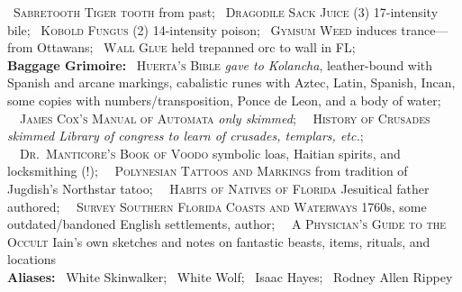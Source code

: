 \documentclass[11pt]{article}
\newcommand{\heading}[1]{{\sc\bfseries #1}}
\begin{document}
\ \textsc{Sabretooth Tiger tooth} from past;
\ \textsc{Dragodile Sack Juice} (3) 17-intensity bile;
\ \textsc{Kobold Fungus} (2) 14-intensity poison;
\ \textsc{Gymsum Weed} induces trance---from Ottawans;
\ \textsc{Wall Glue} held trepanned orc to wall in FL;
%
\\[6pt]
%
\heading{Baggage Grimoire:}
\
\textsc{Huerta's Bible} {\it gave to Kolancha}, leather-bound with
Spanish and arcane markings, cabalistic runes with Aztec, Latin,
Spanish, Incan, some copies with numbers/transposition, Ponce de Leon,
and a body of water;
\ \
\textsc{James Cox's Manual of Automata} {\it only skimmed};
\ \
\textsc{History of Crusades} {\it skimmed Library of congress to learn
  of crusades, templars, etc.};
\ \
\textsc{Dr.\ Manticore's Book of Voodo} symbolic loas, Haitian
spirits, and locksmithing (!);
\ \
\textsc{Polynesian Tattoos and Markings} from tradition of Jugdish's
Northstar tatoo;
\ \
\textsc{Habits of Natives of Florida} Jesuitical father authored;
\ \
\textsc{Survey Southern Florida Coasts and Waterways} 1760s, some
outdated/bandoned English settlements, author;
\ \
\textsc{A Physician's Guide to the Occult} Iain's own sketches and
notes on fantastic beasts, items, rituals, and locations
\\[6pt]
\heading{Aliases:} \ White Skinwalker; \ White Wolf; \ Isaac Hayes; \
Rodney Allen Rippey
%
\end{document}
